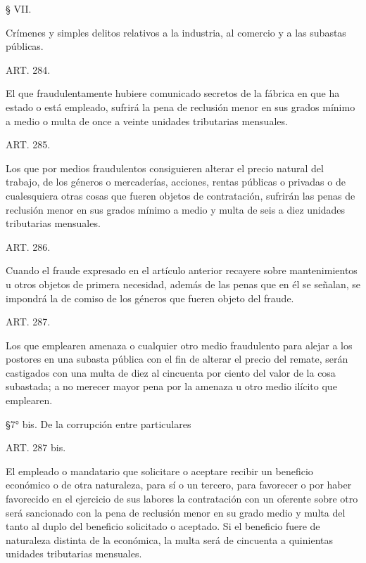     § VII.

    Crímenes y simples delitos relativos a la industria, al comercio y a las subastas públicas.





    ART. 284.

    El que fraudulentamente hubiere comunicado secretos de la fábrica en que ha estado o está empleado, sufrirá la pena de reclusión menor en sus grados mínimo a medio o multa de once a veinte unidades tributarias mensuales.








    ART. 285.

    Los que por medios fraudulentos consiguieren alterar el precio natural del trabajo, de los géneros o mercaderías, acciones, rentas públicas o privadas o de cualesquiera otras cosas que fueren objetos de contratación, sufrirán las penas de reclusión menor en sus grados mínimo a medio y multa de seis a diez unidades tributarias mensuales.








    ART. 286.

    Cuando el fraude expresado en el artículo anterior recayere sobre mantenimientos u otros objetos de primera necesidad, además de las penas que en él se señalan, se impondrá la de comiso de los géneros que fueren objeto del fraude.



    ART. 287.

    Los que emplearen amenaza o cualquier otro medio fraudulento para alejar a los postores en una subasta pública con el fin de alterar el precio del remate, serán castigados con una multa de diez al cincuenta por ciento del valor de la cosa subastada; a no merecer mayor pena por la amenaza u otro medio ilícito que emplearen.



    §7° bis. De la corrupción entre particulares






   
    ART. 287 bis.

    El empleado o mandatario que solicitare o aceptare recibir un beneficio económico o de otra naturaleza, para sí o un tercero, para favorecer o por haber favorecido en el ejercicio de sus labores la contratación con un oferente sobre otro será sancionado con la pena de reclusión menor en su grado medio y multa del tanto al duplo del beneficio solicitado o aceptado. Si el beneficio fuere de naturaleza distinta de la económica, la multa será de cincuenta a quinientas unidades tributarias mensuales.

